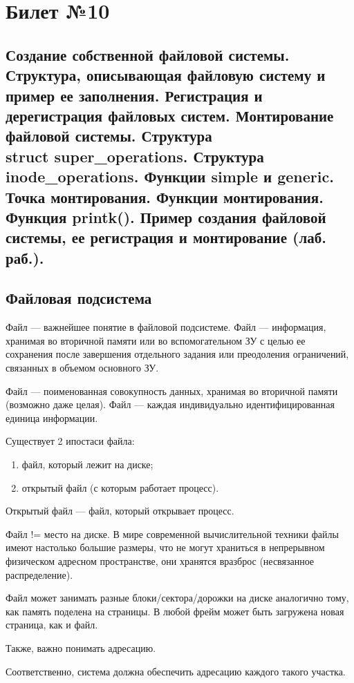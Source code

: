\chapter{Билет №10}

\section*{Создание собственной файловой системы. Структура, описывающая файловую систему и пример ее заполнения. Регистрация и дерегистрация файловых систем. Монтирование файловой системы. Структура \\struct super\_operations. Структура inode\_operations. Функции simple и generic. Точка монтирования. Функции монтирования. Функция printk(). Пример создания файловой системы, ее регистрация и монтирование (лаб. раб.).}


\section{Файловая подсистема}
Файл --- важнейшее понятие в файловой подсистеме. Файл --- информация, хранимая во вторичной памяти или во вспомогательном ЗУ с целью ее сохранения после завершения отдельного задания или преодоления ограничений, связанных в объемом основного ЗУ.

Файл --- поименованная совокупность данных, хранимая во вторичной памяти (возможно даже целая). Файл --- каждая индивидуально идентифицированная единица информации.

Существует 2 ипостаси файла:
\begin{enumerate}
	\item файл, который лежит на диске;
	\item открытый файл (с которым работает процесс).
\end{enumerate}

Открытый файл --- файл, который открывает процесс.

Файл != место на диске. В мире современной вычислительной техники файлы имеют настолько большие размеры, что не могут храниться в непрерывном физическом адресном пространстве, они хранятся вразброс (несвязанное распределение).

Файл может занимать разные блоки/сектора/дорожки на диске аналогично тому, как память поделена на страницы. В любой фрейм может быть загружена новая страница, как и файл. 

Также, важно понимать адресацию. 

Соответственно, система должна обеспечить адресацию каждого такого участка.

